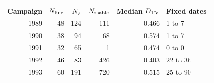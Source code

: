 \begin{tabular}{rrrrrl}
\toprule
Campaign & $N_{\rm line}$ & $N_F$ & $N_{\rm usable}$ & Median $D_{\rm TV}$ & Fixed dates \\
\midrule
1989 & 48 & 124 & 111 & 0.466 & 1 to 7 \\
1990 & 38 & 94 & 68 & 0.574 & 1 to 7 \\
1991 & 32 & 65 & 1 & 0.474 & 0 to 0 \\
1992 & 46 & 83 & 426 & 0.403 & 22 to 36 \\
1993 & 60 & 191 & 720 & 0.515 & 25 to 90 \\
\bottomrule
\end{tabular}
